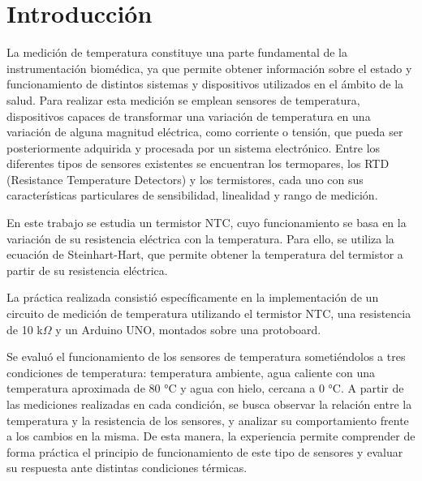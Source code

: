 \section{Introducción}
La medición de temperatura constituye una parte fundamental de la 
instrumentación biomédica, ya que permite obtener información sobre el estado
 y funcionamiento de distintos sistemas y dispositivos utilizados en el ámbito de la salud. 
 Para realizar esta medición se emplean sensores de temperatura, dispositivos capaces de 
 transformar una variación de temperatura en una variación de alguna magnitud eléctrica, como 
 corriente o tensión, que pueda ser posteriormente adquirida y procesada por un 
 sistema electrónico. Entre los diferentes tipos de sensores existentes se encuentran los termopares, 
los RTD (Resistance Temperature Detectors) y los termistores, cada uno con sus características 
particulares de sensibilidad, linealidad y rango de medición.

En este trabajo se estudia un termistor NTC, cuyo funcionamiento se basa 
en la variación de su resistencia eléctrica con la temperatura. Para ello, se utiliza la ecuación de Steinhart-Hart,
que permite obtener la temperatura del termistor a partir de su resistencia eléctrica.

La práctica realizada consistió específicamente en la implementación de un circuito
 de medición de temperatura utilizando el termistor NTC, una resistencia de 10 k$\Omega$
y un Arduino UNO, montados sobre una protoboard. 

Se evaluó el funcionamiento de los sensores de temperatura sometiéndolos a tres condiciones de temperatura: 
temperatura ambiente, agua caliente con una temperatura aproximada de 80 °C y agua con hielo, cercana a 0 °C. 
A partir de las mediciones realizadas en cada condición, se busca observar la relación entre la temperatura
 y la resistencia de los sensores, y analizar su comportamiento frente a los cambios en la misma. 
 De esta manera, la experiencia permite comprender de forma práctica el principio de funcionamiento
  de este tipo de sensores y evaluar su respuesta ante distintas condiciones térmicas.